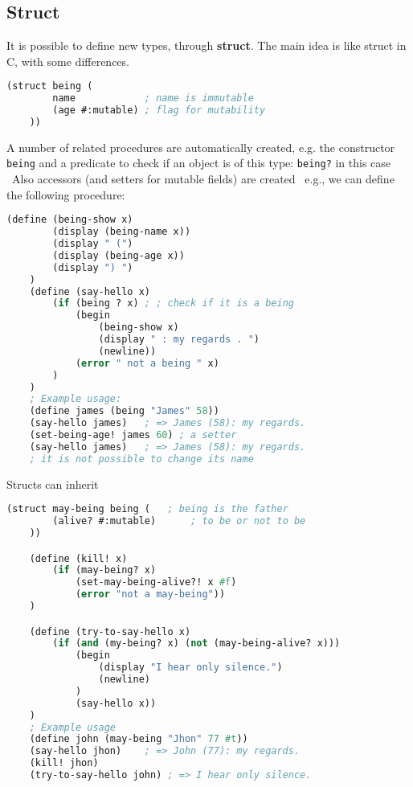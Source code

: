\subsection{Struct}
It is possible to define new types, through \textbf{struct}.
The main idea is like struct in C, with some differences.
\begin{lstlisting}[language=Lisp]
    (struct being (
        name            ; name is immutable
        (age #:mutable) ; flag for mutability
    ))
\end{lstlisting}
A number of related procedures are automatically created, e.g. the constructor \texttt{being} and a predicate to check if an object is of this type: \texttt{being?} in this case \
Also accessors (and setters for mutable fields) are created \
e.g., we can define the following procedure:
\begin{lstlisting}[language=Lisp]
    (define (being-show x)
        (display (being-name x))
        (display " (")
        (display (being-age x))
        (display ") ")
    )
    (define (say-hello x)
        (if (being ? x) ; ; check if it is a being
            (begin
                (being-show x)
                (display " : my regards . ")
                (newline))
            (error " not a being " x)
        )
    )
    ; Example usage:
    (define james (being "James" 58))
    (say-hello james)   ; => James (58): my regards.
    (set-being-age! james 60) ; a setter
    (say-hello james)   ; => James (58): my regards.
    ; it is not possible to change its name
\end{lstlisting}
Structs can inherit
\begin{lstlisting}[language=Lisp]
    (struct may-being being (   ; being is the father
        (alive? #:mutable)      ; to be or not to be
    ))

    (define (kill! x)
        (if (may-being? x)
            (set-may-being-alive?! x #f)
            (error "not a may-being"))
    )

    (define (try-to-say-hello x)
        (if (and (my-being? x) (not (may-being-alive? x)))
            (begin
                (display "I hear only silence.")
                (newline)
            )
            (say-hello x))
    )
    ; Example usage
    (define john (may-being "Jhon" 77 #t))
    (say-hello jhon)    ; => John (77): my regards.
    (kill! jhon)
    (try-to-say-hello john) ; => I hear only silence.
\end{lstlisting}

